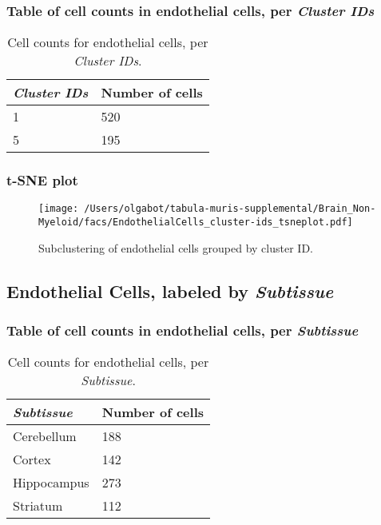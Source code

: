 \subsubsection{Table of cell counts in endothelial cells, per \emph{Cluster IDs}}\begin{table}[h]
\centering
\label{my-label}
\begin{tabular}{@{}ll@{}}
\toprule

\emph{Cluster IDs}& Number of cells \\ \midrule
1 & 520 \\

5 & 195 \\
\bottomrule
\end{tabular}
\caption{Cell counts for endothelial cells, per \emph{Cluster IDs}.}
\end{table}

\clearpage
\subsubsection{t-SNE plot}
\begin{figure}[h]
\centering
\texttt{[image: /Users/olgabot/tabula-muris-supplemental/Brain\_Non-Myeloid/facs/EndothelialCells\_cluster-ids\_tsneplot.pdf]}

\caption{Subclustering of endothelial cells grouped by cluster ID.
}
\end{figure}


\clearpage

\subsection{Endothelial Cells, labeled by \emph{Subtissue}}
\subsubsection{Table of cell counts in endothelial cells, per \emph{Subtissue}}\begin{table}[h]
\centering
\label{my-label}
\begin{tabular}{@{}ll@{}}
\toprule

\emph{Subtissue}& Number of cells \\ \midrule
Cerebellum & 188 \\

Cortex & 142 \\

Hippocampus & 273 \\

Striatum & 112 \\
\bottomrule
\end{tabular}
\caption{Cell counts for endothelial cells, per \emph{Subtissue}.}
\end{table}

